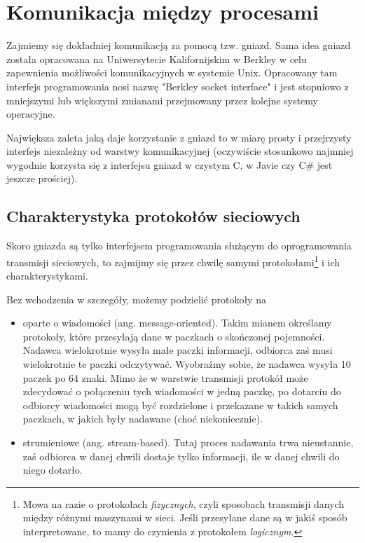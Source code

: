 ﻿\section{Komunikacja między procesami}
\label{apiKomunikacja}

Zajmiemy się dokładniej komunikacją za pomocą tzw. gniazd. 
Sama idea gniazd została opracowana na Uniwersytecie Kalifornijskim w Berkley w celu 
zapewnienia możliwości komunikacyjnych w systemie Unix. Opracowany tam interfejs programowania 
nosi nazwę "Berkley socket interface" i jest stopniowo z mniejszymi lub większymi 
zmianami przejmowany przez kolejne systemy operacyjne. 

Największa zaleta jaką daje korzystanie z gniazd to w miarę prosty i przejrzysty interfejs 
niezależny od warstwy komunikacyjnej (oczywiście stosunkowo najmniej wygodnie korzysta 
się z interfejsu gniazd w czystym C, w Javie czy C\# jest jeszcze prościej). 

\subsection{Charakterystyka protokołów sieciowych}

Skoro gniazda są tylko interfejsem programowania służącym do oprogramowania transmisji 
sieciowych, to zajmijmy się przez chwilę samymi protokołami\footnote{Mowa na razie
o protokołach {\em fizycznych}, czyli sposobach transmisji danych między różnymi
maszynami w sieci. Jeśli przesyłane dane są w jakiś sposób interpretowane, to mamy
do czynienia z protokołem {\em logicznym}.} i ich charakterystykami. 

Bez wchodzenia w szczegóły, możemy podzielić protokoły na 
\begin{itemize}
  \item oparte o wiadomości (ang. message-oriented). Takim mianem określamy protokoły, które 
        przesyłają dane w paczkach o skończonej pojemności. Nadawca wielokrotnie 
	wysyła małe paczki informacji, odbiorca zaś musi wielokrotnie te paczki odczytywać. 
	Wyobraźmy sobie, że nadawca wysyła 10 paczek po 64 znaki. Mimo że w warstwie 
	transmisji protokół może zdecydować o połączeniu tych wiadomości w jedną paczkę, 
	po dotarciu do odbiorcy wiadomości mogą być rozdzielone i przekazane w takich samych 
	paczkach, w jakich były nadawane (choć niekoniecznie). 
  \item strumieniowe (ang. stream-based). Tutaj proces nadawania trwa nieustannie, zaś odbiorca 
        w danej chwili dostaje tylko informacji, ile w danej chwili do niego dotarło. 
\end{itemize}

